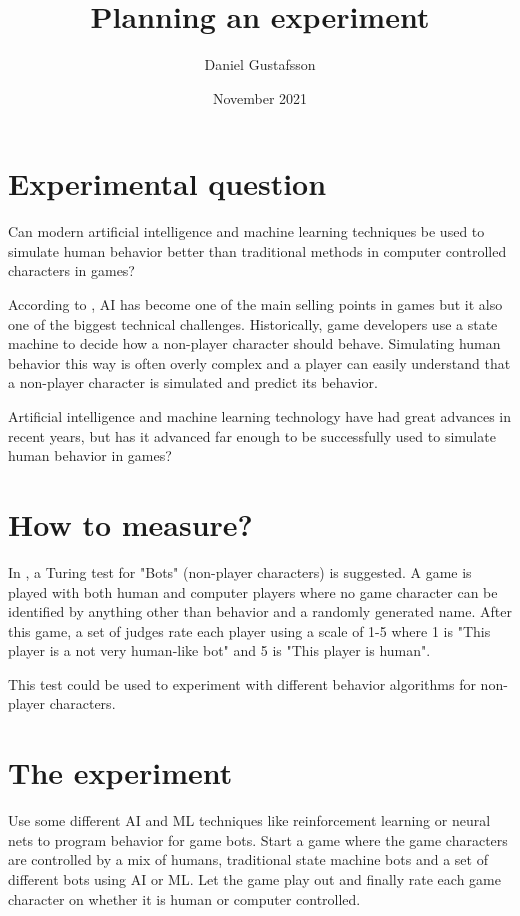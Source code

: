 \documentclass[11pt, a4paper]{article}
\title{Planning an experiment}
\author{Daniel Gustafsson}
\date{November 2021}
\begin{document}
\maketitle

\section{Experimental question}
Can modern artificial intelligence and machine learning techniques be used to
simulate human behavior better than traditional methods in computer controlled characters in games?

\vspace{2mm}\noindent According to \cite{ai_in_games}, AI has become one of the main selling points in
games but it also one of the biggest technical challenges.
Historically, game developers use a state machine to decide how a non-player character should behave.
Simulating human behavior this way is often overly complex and a player can easily understand that
a non-player character is simulated and predict its behavior.

Artificial intelligence and machine learning technology have had great advances in recent years,
but has it advanced far enough to be successfully used to simulate human behavior in games?

\section{How to measure?}
In \cite{turing_test}, a Turing test for "Bots" (non-player characters) is suggested.
A game is played with both human and computer players where no game character can be identified
by anything other than behavior and a randomly generated name.
After this game, a set of judges rate each player using a scale of 1-5 where 1 is 
"This player is a not very human-like bot" and 5 is "This player is human".

This test could be used to experiment with different behavior algorithms for non-player characters.

\section{The experiment}
Use some different AI and ML techniques like reinforcement learning or neural nets to
program behavior for game bots. Start a game where the game characters are controlled by a mix of
humans, traditional state machine bots and a set of different bots using AI or ML.
Let the game play out and finally rate each game character on whether it is human or computer controlled.
\end{document}
